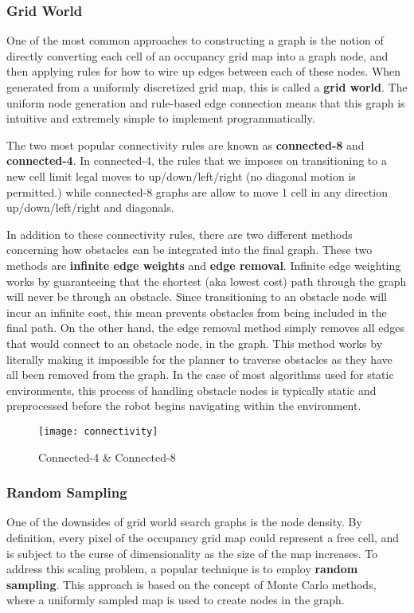 \subsubsection{Grid World}
One of the most common approaches to constructing a graph is the notion of directly converting each cell of an occupancy grid map into a graph node, and then applying rules for how to wire up  edges between each of these nodes. When generated from a uniformly discretized grid map, this is called a \textbf{grid world}. The uniform node generation and rule-based edge connection means that this graph is intuitive and extremely simple to implement programmatically.

The two most popular connectivity rules are known as \textbf{connected-8} and \textbf{connected-4}. In connected-4, the rules that we imposes on transitioning to a new cell limit legal moves to up/down/left/right (no diagonal motion is permitted.) while connected-8 graphs are allow to move 1 cell in any direction up/down/left/right and diagonals. 

In addition to these connectivity rules, there are two different methods concerning how obstacles can be integrated into the final graph. These two methods are \textbf{infinite edge weights} and \textbf{edge removal}. Infinite edge weighting works by guaranteeing that the shortest (aka lowest cost) path through the graph will never be through an obstacle. Since transitioning to an obstacle node will incur an infinite cost, this mean prevents obstacles from being included in the final path. On the other hand, the edge removal method simply removes all edges that would connect to an obstacle node, in the graph. This method works by literally making it impossible for the planner to traverse obstacles as they have all been removed from the graph. In the case of most algorithms used for static environments, this process of handling obstacle nodes is typically static and preprocessed before the robot begins navigating within the environment.

\begin{figure}[t]
  \texttt{[image: connectivity]}
  \centering
  \label{fig:connectivity}
  \caption{Connected-4 \& Connected-8}
\end{figure}

\subsubsection{Random Sampling}

One of the downsides of grid world search graphs is the node density. By definition, every pixel of the occupancy grid map could represent a free cell, and is subject to the curse of dimensionality as the size of the map increases. To address this scaling problem, a popular technique is to employ \textbf{random sampling}. This approach is based on the concept of Monte Carlo methods, where a uniformly sampled map is used to create nodes in the graph. 

